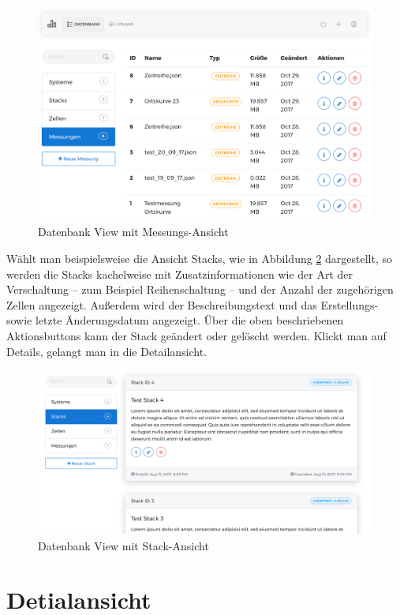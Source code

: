 \begin{figure}
\centering
\includegraphics[width=\textwidth]{Figures/messungen}
\caption{Datenbank View mit Messungs-Ansicht}
\label{fig:messungen}
\end{figure}

Wählt man beispielsweise die Ansicht Stacks, wie in Abbildung \ref{fig:stacks} dargestellt, so werden die Stacks kachelweise mit Zusatzinformationen wie der Art der Verschaltung -- zum Beispiel Reihenschaltung -- und der Anzahl der zugehörigen Zellen angezeigt. Außerdem wird der Beschreibungstext und das Erstellungs- sowie letzte Änderungsdatum angezeigt. Über die oben beschriebenen Aktionsbuttons kann der Stack geändert oder gelöscht werden. Klickt man auf Details, gelangt man in die Detailansicht.

\begin{figure}
\centering
\includegraphics[width=\textwidth]{Figures/stacks}
\caption{Datenbank View mit Stack-Ansicht}
\label{fig:stacks}
\end{figure}

\section{Detialansicht}

